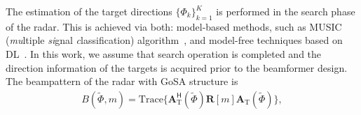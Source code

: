 \documentclass[journal,10pt]{IEEEtran}
\begin{document}
	The estimation of the target directions $\{\Phi_k\}_{k=1}^K$ is performed in the search phase of the radar. This is achieved via both: model-based methods, such as MUSIC (\textit{mu}ltiple \textit{si}gnal \textit{c}lassification) algorithm~\cite{music}, and model-free techniques based on DL~\cite{elbir_DL_MUSIC}. In this work, we assume that search operation is completed and the direction information of the targets is acquired prior to the beamformer design. The beampattern of the radar with GoSA structure is 
	\begin{align}
	B(\tilde{\Phi},m) = \mathrm{Trace}\{\mathbf{A}_\mathrm{T}^\textsf{H}(\tilde{\Phi})\mathbf{R}[m]\mathbf{A}_\mathrm{T}(\tilde{\Phi})\},
	\end{align}
\end{document}
